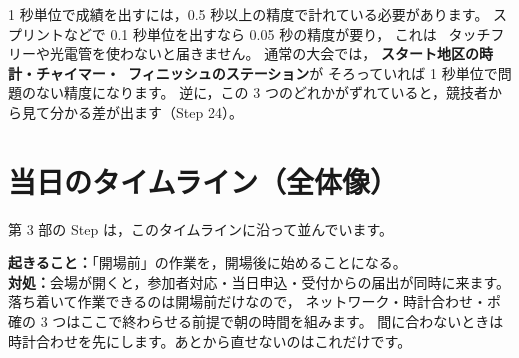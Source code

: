\begin{Note}[どのくらいの精度で計れていればよいか]
1 秒単位で成績を出すには，0.5 秒以上の精度で計れている必要があります。
スプリントなどで 0.1 秒単位を出すなら 0.05 秒の精度が要り，
これは \tSIAC\ タッチフリーや光電管を使わないと届きません。
通常の大会では，
\textbf{スタート地区の時計・チャイマー・\tSI\ フィニッシュのステーション}が
そろっていれば 1 秒単位で問題のない精度になります。
逆に，この 3 つのどれかがずれていると，競技者から見て分かる差が出ます（Step 24）。
\end{Note}

\section{当日のタイムライン（全体像）}
\tALL

第 3 部の Step は，このタイムラインに沿って並んでいます。

\begin{Fig}
\end{Fig}

\begin{Fail}
\textbf{起きること：}「開場前」の作業を，開場後に始めることになる。\\
\textbf{対処：}会場が開くと，参加者対応・当日申込・受付からの届出が同時に来ます。
落ち着いて作業できるのは開場前だけなので，
ネットワーク・時計合わせ・ポ確の 3 つはここで終わらせる前提で朝の時間を組みます。
間に合わないときは時計合わせを先にします。あとから直せないのはこれだけです。
\end{Fail}
